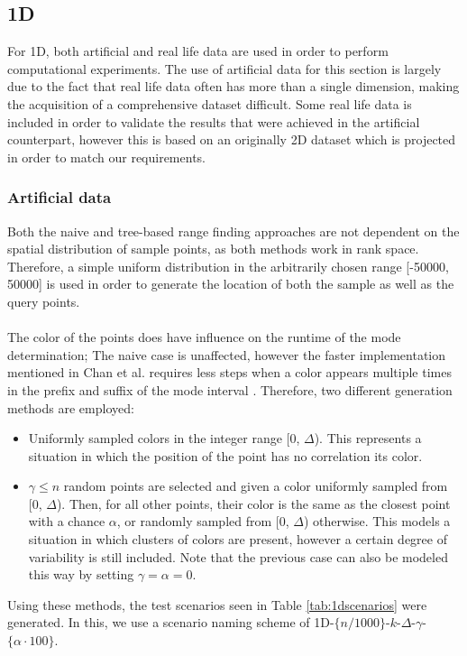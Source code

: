 \documentclass{article}
\newcommand{\fb}[1]{{\color{blue}#1}}
\begin{document}
\subsection{1D}
For 1D, both artificial and real life data \fb{are} used in order to perform
computational experiments. The use of artificial data for this section \fb{is} largely due to the fact that real life data often has more than a single
dimension, making the acquisition of a comprehensive dataset difficult.
Some real life data \fb{is} included in order to validate the results that were
achieved in the artificial counterpart, however this \fb{is} based on an originally
2D dataset which \fb{is} projected in order to match our requirements.
\subsubsection*{Artificial data} Both the naive and tree-based range finding
approaches are not dependent on the spatial distribution of sample points, as
both methods work in rank space. Therefore, a simple uniform distribution in
the arbitrarily chosen range [-50000, 50000] \fb{is} used in order to generate the
location of both the sample as well as the query points. \\\\ The color of the
points does have influence on the runtime of the mode determination; The naive
case is unaffected, however the faster implementation mentioned in Chan et al.
requires less steps when a color appears multiple times in the prefix and
suffix of the mode interval \cite{Chan2014}. Therefore, two different
generation methods \fb{are} employed:
\begin{itemize}
    \item Uniformly sampled colors in the integer range [0, $\Delta$). This represents a
          situation in which the position of the point has no correlation its color.
    \item $\gamma \leq n$ random points are selected and given a color uniformly sampled from [0, $\Delta$). Then, for all other points, their color is the same as the closest point with a chance $\alpha$, or randomly sampled from [0, $\Delta$) otherwise. This models a situation in which clusters of colors are present, however a certain degree of variability is still included. Note that the previous case can also be modeled this way by setting $\gamma=\alpha=0$.
\end{itemize}
Using these methods, the test scenarios \fb{seen in Table \ref{tab:1dscenarios} were generated. In this, we use a scenario naming scheme of 1D-$\{n/1000\}$-$k$-$\Delta$-$\gamma$-$\{\alpha \cdot 100\}$.} \\
\end{document}
